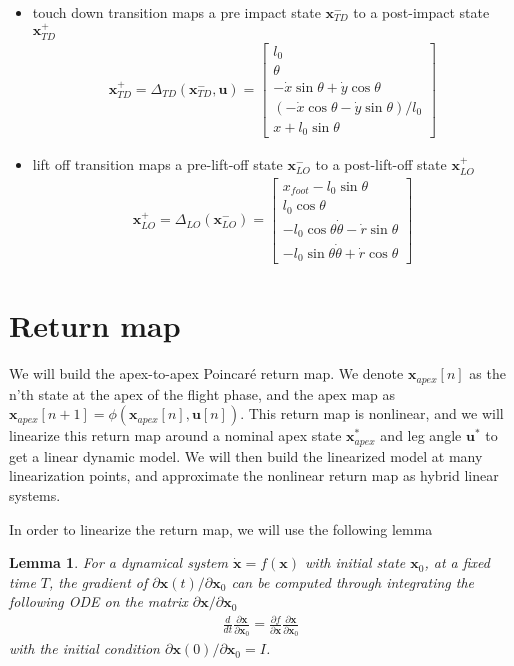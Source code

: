 \documentclass{article}
\newtheorem{lemma}{Lemma}
\begin{document}
\begin{itemize}
	\item touch down transition maps a pre impact state $\mathbf{x}_{TD}^-$ to a post-impact state $\mathbf{x}_{TD}^+$
		\begin{align}
			\mathbf{x}_{TD}^+ = \Delta_{TD}(\mathbf{x}_{TD}^-, \mathbf{u}) = \begin{bmatrix} l_0\\\theta\\ -\dot{x}\sin\theta+\dot{y}\cos\theta\\(-\dot{x}\cos\theta-\dot{y}\sin\theta)/l_0\\x+l_0\sin\theta\end{bmatrix}
		\end{align}
	\item lift off transition maps a pre-lift-off state $\mathbf{x}_{LO}^-$ to a post-lift-off state $\mathbf{x}_{LO}^+$
		\begin{align}
			\mathbf{x}_{LO}^+ = \Delta_{LO}(\mathbf{x}_{LO}^-) = \begin{bmatrix}x_{foot} - l_0\sin\theta\\ l_0\cos\theta\\-l_0\cos\theta\dot{\theta}-\dot{r}\sin\theta \\ -l_0\sin\theta\dot{\theta}+\dot{r}\cos\theta\end{bmatrix}
		\end{align}
\end{itemize}

\section{Return map}
We will build the apex-to-apex Poincar\'e return map. We denote $\mathbf{x}_{apex}[n]$ as the n'th state at the apex of the flight phase, and the apex map as $\mathbf{x}_{apex}[n+1] = \phi(\mathbf{x}_{apex}[n], \mathbf{u}[n])$. This return map is nonlinear, and we will linearize this return map around a nominal apex state $\mathbf{x}^*_{apex}$ and leg angle $\mathbf{u}^*$ to get a linear dynamic model. We will then build the linearized model at many linearization points, and approximate the nonlinear return map as hybrid linear systems.

In order to linearize the return map, we will use the following lemma
\begin{lemma}
	\label{lemma:gradient_x0}
	For a dynamical system $\dot{\mathbf{x}} = f(\mathbf{x})$ with initial state $\mathbf{x}_0$, at a fixed time $T$, the gradient of $\partial{\mathbf{x}(t)}/\partial \mathbf{x}_0$ can be computed through integrating the following ODE on the matrix $\partial\mathbf{x}/\partial\mathbf{x}_0$
	\begin{align}
		\frac{d}{dt}\frac{\partial\mathbf{x}}{\partial \mathbf{x}_0} = \frac{\partial f}{\partial\mathbf{x}}\frac{\partial \mathbf{x}}{\partial \mathbf{x}_0}
	\end{align}
	with the initial condition $\partial \mathbf{x}(0)/\partial\mathbf{x}_0 = I$.
\end{lemma}
\end{document}
